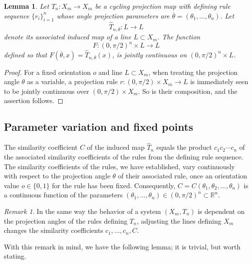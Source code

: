 \documentclass[12pt]{amsart}
\theoremstyle{theorem}
\newtheorem{lemma}{Lemma}
\theoremstyle{remark}
\newtheorem{remark}[theorem]{Remark}
\numberwithin{equation}{section}
\newcommand{\RR}{\mathbb{R}}
\begin{document}
\begin{lemma}\label{lem:inducedIsContinuous}
Let $T_n:X_m\rightarrow X_m$ be a cycling projection map with defining rule sequence $\{r_i\}_{i=1}^n$ whose angle projection parameters are $\overline{\theta} = (\theta_1,\dots,\theta_n)$. Let
\[
\hat{T}_{n,\overline{\theta}}:L\rightarrow L
\]
denote its associated induced map of a line $L \subset X_m$.
The function
\[
F:(0,\pi/2)^n \times L \rightarrow L
\]
defined so that $F(\overline{\theta}, x) = \hat{T}_{n,\overline{\theta}}(x)$, is jointly continuous on $(0,\pi/2)^n \times L$.
\end{lemma}
\begin{proof}
For a fixed orientation $o$ and line $L \subset X_m$, when treating the projection angle $\theta$ as a variable, a projection rule $r:(0,\pi/2)\times X_m\rightarrow L$ is immediately seen to be jointly continuous over $(0,\pi/2)\times X_m$. So is their composition, and the assertion follows.
\end{proof}



\subsection{Parameter variation and fixed points}

The similarity coefficient $C$ of the induced map $\hat{T}_n$ equals the product $c_1c_2\cdots c_n$ of the associated similarity coefficients of the rules from the defining rule sequence.
The similarity coefficients of the rules, we have established, vary continuously with respect to the projection angle $\theta$ of their associated rule, once an orientation value $o \in \{0,1\}$ for the rule has been fixed.
Consequently, $C = C(\theta_1,\theta_2,\dots,\theta_n)$ is a continuous function of the parameters $(\theta_1,\dots,\theta_n) \in (0,\pi/2)^n\subset \RR^n$.

\begin{remark}\label{rem:lineRotation}
In the same way the behavior of a system $(X_m, T_n)$ is dependent on the projection angles of the rules defining $T_n$, adjusting the lines defining $X_m$ changes the similarity coefficients $c_1,\dots,c_n, C$.
\end{remark}

With this remark in mind, we have the following lemma; it is trivial, but worth stating.
\end{document}

